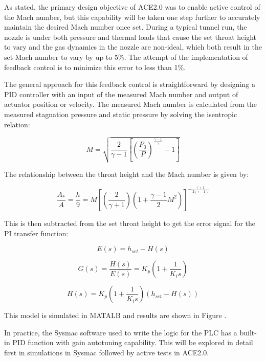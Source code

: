 As stated, the primary design objective of ACE2.0 was to enable active control of the Mach number, but this capability will be taken one step further to accurately maintain the desired Mach number once set. During a typical tunnel run, the nozzle is under both pressure and thermal loads that cause the set throat height to vary and the gas dynamics in the nozzle are non-ideal, which both result in the set Mach number to vary by up to 5\%. The attempt of the implementation of feedback control is to minimize this error to less than 1\%.

The general approach for this feedback control is straightforward by designing a PID controller with an input of the measured Mach number and output of actuator position or velocity. The measured Mach number is calculated from the measured stagnation pressure and static pressure by solving the isentropic relation:

\begin{equation} 
    M = \sqrt{\frac{2}{\gamma - 1} \left[\left(\frac{P_0}{P}\right)^{\frac{\gamma - 1}{\gamma}} - 1\right]}
\end{equation}

The relationship between the throat height and the Mach number is given by:

\begin{equation}
    \frac{A_*}{A} = \frac{h}{9} = M \left[ \left( \frac{2}{\gamma+1}  \right) \left( 1 + \frac{\gamma-1}{2} M^2  \right) \right]^{-\frac{\gamma+1}{2(\gamma-1)} }
\end{equation}

This is then subtracted from the set throat height to get the error signal for the PI transfer function:

\begin{equation}
    E(s) = h_{set} - H(s)
\end{equation}

\begin{equation}
    G(s) = \frac{H(s)}{E(s)} = K_p \left(1 + \frac{1}{K_i s}\right)
\end{equation}

\begin{equation}
    H(s) = K_p \left(1 + \frac{1}{K_i s}\right) \left(h_{set} - H(s)\right)
\end{equation}

This model is simulated in MATALB and results are shown in Figure .

In practice, the Sysmac software used to write the logic for the PLC has a built-in PID function with gain autotuning capability. This will be explored in detail first in simulations in Sysmac followed by active tests in ACE2.0. 

